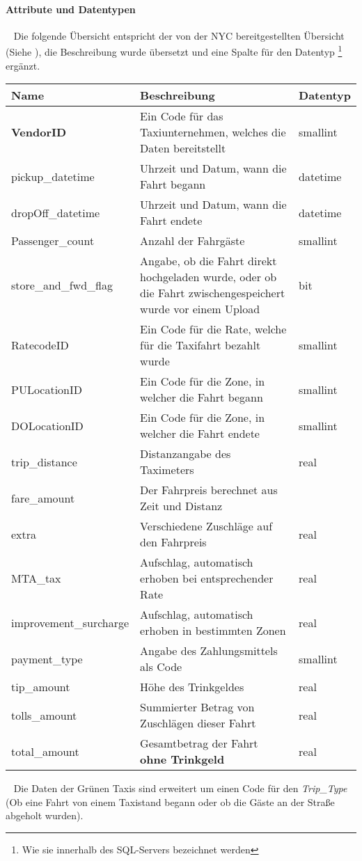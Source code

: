 \paragraph{Attribute und Datentypen} ~\newline
Die folgende Übersicht entspricht der von der NYC bereitgestellten Übersicht (Siehe \cite{DataDicYellow}), die Beschreibung wurde übersetzt und eine Spalte für den Datentyp \footnote{Wie sie innerhalb des SQL-Servers bezeichnet werden} ergänzt. 
~\newline
\begin{center}
	\begin{tabular}{|p{}|p{}|p{}|}
		\hline
		Name & Beschreibung & Datentyp  \\ \hline
		\textbf{VendorID} & Ein Code für das Taxiunternehmen, welches die Daten bereitstellt & smallint \\ \hline
		pickup\_datetime & Uhrzeit und Datum, wann die Fahrt begann & datetime \\ \hline
		dropOff\_datetime & Uhrzeit und Datum, wann die Fahrt endete & datetime \\ \hline
		Passenger\_count & Anzahl der Fahrgäste & smallint \\ \hline	
		store\_and\_fwd\_flag & Angabe, ob die Fahrt direkt hochgeladen wurde, oder ob die Fahrt zwischengespeichert wurde vor einem Upload & bit \\ \hline
		RatecodeID & Ein Code für die Rate, welche für die Taxifahrt bezahlt wurde & smallint \\ \hline
		PULocationID & Ein Code für die Zone, in welcher die Fahrt begann & smallint \\ \hline
		DOLocationID & Ein Code für die Zone, in welcher die Fahrt endete & smallint \\ \hline
		trip\_distance & Distanzangabe des Taximeters & real \\ \hline
		fare\_amount & Der Fahrpreis berechnet aus Zeit und Distanz & \\ \hline
		extra & Verschiedene Zuschläge auf den Fahrpreis & real \\ \hline 
		MTA\_tax & Aufschlag, automatisch erhoben bei entsprechender Rate& real \\ \hline
		improvement\_surcharge & Aufschlag, automatisch erhoben in bestimmten Zonen & real \\ \hline
		payment\_type & Angabe des Zahlungsmittels als Code & smallint \\ \hline 
		tip\_amount & Höhe des Trinkgeldes & real \\ \hline
		tolls\_amount & Summierter Betrag von Zuschlägen dieser Fahrt& real \\ \hline
		total\_amount & Gesamtbetrag der Fahrt \textbf{ohne Trinkgeld} & real \\ \hline 
	\end{tabular}
\end{center}
~\newline
Die Daten der Grünen Taxis sind erweitert um einen Code für den \textit{Trip\_Type} (Ob eine Fahrt von einem Taxistand begann oder ob die Gäste an der Straße abgeholt wurden).

